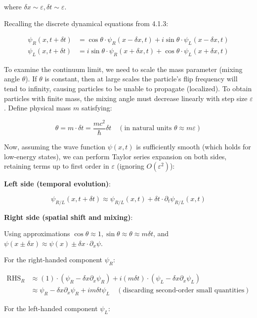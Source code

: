 where $\delta x \sim \varepsilon, \delta t \sim \varepsilon$.

Recalling the discrete dynamical equations from 4.1.3:

\begin{align*}
\psi_R(x, t+\delta t) &= \cos\theta \cdot \psi_R(x-\delta x, t) + i \sin\theta \cdot \psi_L(x-\delta x, t) \\
\psi_L(x, t+\delta t) &= i \sin\theta \cdot \psi_R(x+\delta x, t) + \cos\theta \cdot \psi_L(x+\delta x, t)
\end{align*}

To examine the continuum limit, we need to scale the mass parameter (mixing angle $\theta$). If $\theta$ is constant, then at large scales the particle's flip frequency will tend to infinity, causing particles to be unable to propagate (localized). To obtain particles with finite mass, the mixing angle must decrease linearly with step size $\varepsilon$. Define physical mass $m$ satisfying:

\[\theta = m \cdot \delta t = \frac{m c^2}{\hbar} \delta t \quad (\text{in natural units } \theta \approx m \varepsilon)\]

Now, assuming the wave function $\psi(x,t)$ is sufficiently smooth (which holds for low-energy states), we can perform Taylor series expansion on both sides, retaining terms up to first order in $\varepsilon$ (ignoring $O(\varepsilon^2)$):

\textbf{Left side (temporal evolution)}:

\[\psi_{R/L}(x, t+\delta t) \approx \psi_{R/L}(x, t) + \delta t \cdot \partial_t \psi_{R/L}(x, t)\]

\textbf{Right side (spatial shift and mixing)}:

Using approximations $\cos\theta \approx 1, \sin\theta \approx \theta \approx m \delta t$, and $\psi(x \pm \delta x) \approx \psi(x) \pm \delta x \cdot \partial_x \psi$.

For the right-handed component $\psi_R$:

\begin{align*}
\text{RHS}_R &\approx (1) \cdot (\psi_R - \delta x \partial_x \psi_R) + i (m \delta t) \cdot (\psi_L - \delta x \partial_x \psi_L) \\
&\approx \psi_R - \delta x \partial_x \psi_R + i m \delta t \psi_L \quad (\text{discarding second-order small quantities})
\end{align*}

For the left-handed component $\psi_L$:

